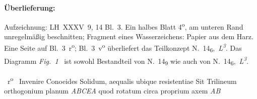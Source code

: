 %
%
%
%
%
\frenchspacing%
%
\begin{ledgroupsized}[r]{120mm}%
\footnotesize%
\pstart%
\noindent\textbf{Überlieferung:}%
\pend%
\end{ledgroupsized}%
\begin{ledgroupsized}[r]{114mm}%
\footnotesize%
\pstart%
\parindent -6mm
%
Aufzeichnung:
LH~XXXV~9, 14 Bl.~3.
Ein halbes Blatt 4\textsuperscript{o},
am unteren Rand unregelmäßig beschnitten;
Fragment eines Wasserzeichens:
Papier aus dem Harz.
Eine Seite auf Bl.~3~r\textsuperscript{o};
Bl.~3~v\textsuperscript{o} überliefert das Teilkonzept N.~14\textsubscript{6},~\textit{L\textsuperscript{3}}.
Das Diagramm \lbrack\textit{Fig.~1}\rbrack\ %
ist sowohl Bestandteil von N.~14\textsubscript{9} wie auch von N.~14\textsubscript{6},~\textit{L\textsuperscript{3}}.
\pend
\end{ledgroupsized}
%
%
%
%
\frenchspacing%
%
%
%
\vspace*{8mm}
%
\count{}
\count{}
\count{}
%
%
\pstart%
\noindent%
%
~r\textsuperscript{o}\rbrack\ %
%
\pend%
\vspace{-0.5em}
%
\pstart%
\centering%
Invenire Conoeides Solidum,%
\protect\protect{}
aequalis ubique resistentiae%
\protect{}%
\protect{}
\pend%
\vspace{0.5em}%
%
\pstart%
\noindent%
Sit Trilineum orthogonium planum \textit{ABCEA}%
\protect{}%
\protect{}
quod rotatum circa proprium axem \textit{AB}
